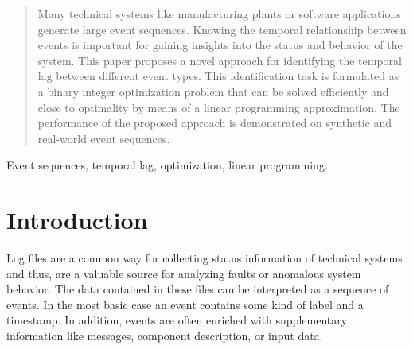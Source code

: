 \documentclass[journal, 10pt]{IEEEtran}
\begin{document}


\maketitle

\begin{abstract}
Many technical systems like manufacturing plants or software applications generate large event sequences. Knowing the temporal relationship between events is important for gaining insights into the status and behavior of the system. This paper proposes a novel approach for identifying the temporal lag between different event types. This identification task is formulated as a binary integer optimization problem that can be solved efficiently and close to optimality by means of a linear programming approximation. The performance of the proposed approach is demonstrated on synthetic and real-world event sequences.
\end{abstract}

\begin{IEEEkeywords}
Event sequences, temporal lag, optimization, linear programming.
\end{IEEEkeywords}


%
\IEEEpeerreviewmaketitle



\section{Introduction}
\label{sec:introduction}
Log files are a common way for collecting status information of technical systems and thus, are a valuable source for analyzing faults or anomalous system behavior. The data contained in these files can be  interpreted as a sequence of events. In the most basic case an event contains some kind of label and a timestamp. In addition, events are often enriched with supplementary information like messages, component description, or input data. 
\end{document}
